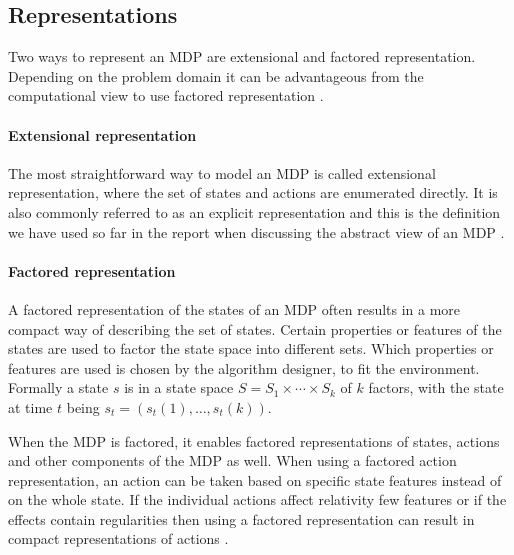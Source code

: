 \subsection{Representations}

Two ways to represent an MDP are extensional and factored representation.
Depending on the problem domain it can be advantageous from the computational
view to use factored representation \parencite{dean1999descision}.

\paragraph{Extensional representation}

The most straightforward way to model an MDP is called extensional
representation, where the set of states and actions are enumerated directly. It
is also commonly referred to as an explicit representation and this is the
definition we have used so far in the report when discussing the abstract view
of an MDP \parencite{dean1999descision}.

\paragraph{Factored representation} 
\label{sec:factored_mdp}

A factored representation of the states of an MDP often results in a more
compact way of describing the set of states. Certain properties or features of
the states are used to factor the state space into different sets. Which
properties or features are used is chosen by the algorithm designer, to fit the
environment. Formally a state $s$ is in a state space $S = S_1 \times \cdots
\times S_k$ of $k$ factors, with the state at time $t$ being $s_t = (s_t(1),
\ldots, s_t(k))$.


When the MDP is factored, it enables factored representations of states,
actions and other components of the MDP as well. When using a factored action
representation, an action can be taken based on specific state features instead
of on the whole state. If the individual actions affect relativity few features
or if the effects contain regularities then using a factored representation can
result in compact representations of actions \parencite{dean1999descision}. 
